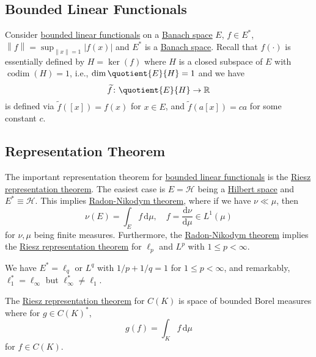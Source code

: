 \subsection{Bounded Linear Functionals}
Consider \hyperref[def:bounded-linear-functional]{bounded linear functionals} on a \hyperref[def:Banach-space]{Banach space} \(E\), \(f\in E^{\ast} \), \(\left\lVert f\right\rVert = \sup _{\left\lVert x\right\rVert = 1}\left\vert f(x) \right\vert \) and \(E^{\ast} \) is a \hyperref[def:Banach-space]{Banach space}. Recall that \(f(\cdot)\) is essentially defined by \(H = \ker(f)\) where \(H\) is a closed subspace of \(E\) with \(\mathop{\mathrm{codim}}(H) = 1\), i.e., \(\dim \quotient{E}{H} = 1 \) and we have
\[
	\widetilde{f} \colon \quotient{E}{H} \to \mathbb{R}
\]
is defined via \(\widetilde{f} ([x]) = f(x)\) for \(x\in E\), and \(\widetilde{f} (a[x]) = ca\)  for some constant \(c\).

\subsection{Representation Theorem}
The important representation theorem for \hyperref[def:bounded-linear-functional]{bounded linear functionals} is the \hyperref[thm:Riesz-representation]{Riesz representation theorem}. The easiest case is \(E = \mathcal{H} \) being a \hyperref[def:Hilbert-space]{Hilbert space} and \(E^{\ast} \equiv \mathcal{H} \). This implies \hyperref[thm:Radon-Nikodym]{Radon-Nikodym theorem}, where if we have \(\nu \ll \mu \), then
\[
	\nu (E) = \int _E f\,\mathrm{d} \mu ,\quad f = \frac{\mathrm{d}\nu }{\mathrm{d}\mu } \in L^1(\mu )
\]
for \(\nu , \mu \) being finite measures. Furthermore, the \hyperref[thm:Radon-Nikodym]{Radon-Nikodym theorem} implies the \hyperref[thm:Riesz-representation]{Riesz representation theorem} for \(\ell _p\) and \(L^p\) with \(1 \leq p < \infty \).

\begin{remark}
	We have \(E^{\ast} = \ell _q\) or \(L^q\) with \(1 / p + 1 / q = 1\) for \(1 \leq p < \infty \), and remarkably, \(\ell _1^{\ast} = \ell _\infty \) but \(\ell _\infty ^{\ast} \neq \ell _1\).
\end{remark}

\begin{remark}
	The \hyperref[thm:Riesz-representation]{Riesz representation theorem} for \(C(K)\) is space of bounded Borel measures where for \(g\in C(K)^{\ast} \),
	\[
		g(f) = \int _K f\,\mathrm{d} \mu
	\]
	for \(f\in C(K)\).
\end{remark}

